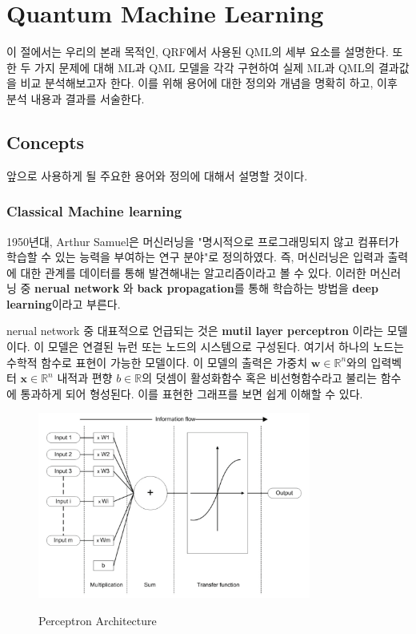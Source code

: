 \section{Quantum Machine Learning}

 이 절에서는 우리의 본래 목적인, QRF에서 사용된 QML의 세부 요소를 설명한다. 또한 두 가지 문제에 대해 ML과 QML 모델을 각각 구현하여 실제 ML과 QML의 결과값을 비교 분석해보고자 한다. 이를 위해 용어에 대한 정의와 개념을 명확히 하고, 이후 분석 내용과 결과를 서술한다.
 \subsection{Concepts} \label{qml:concepts}

 앞으로 사용하게 될 주요한 용어와 정의에 대해서 설명할 것이다.

\subsubsection{Classical Machine learning} 1950년대, Arthur Samuel은 머신러닝을 "명시적으로 프로그래밍되지 않고 컴퓨터가 학습할 수 있는 능력을 부여하는 연구 분야"로 정의하였다\citep{schuld2015introduction}. 즉, 머신러닝은 입력과 출력에 대한 관계를 데이터를 통해 발견해내는 알고리즘이라고 볼 수 있다. 이러한 머신러닝 중 \textbf{nerual network} 와 \textbf{back propagation}를 통해 학습하는 방법을 \textbf{deep learning}이라고 부른다.

nerual network 중 대표적으로 언급되는 것은 \textbf{mutil layer perceptron} 이라는 모델이다. 이 모델은 연결된 뉴런 또는 노드의 시스템으로 구성된다.\cite{gardner1998artificial} 여기서 하나의 노드는 수학적 함수로 표현이 가능한 모델이다. 이 모델의 출력은 가중치 $\mathbf{w} \in \mathbb{R}^n $와의 입력벡터 $\mathbf{x} \in \mathbb{R}^n $ 내적과 편향 $b \in \mathbb{R}$의 덧셈이 활성화함수 혹은 비선형함수라고 불리는 함수에 통과하게 되어 형성된다.\cite{krenker2011introduction}
이를 표현한 그래프를 보면 쉽게 이해할 수 있다. %

\begin{figure}[htb!]
    \centering
    \includegraphics[width=0.8\textwidth]{figs/node.png}\
    \caption{Perceptron Architecture}
    \label{fig:node-image}
\end{figure}

